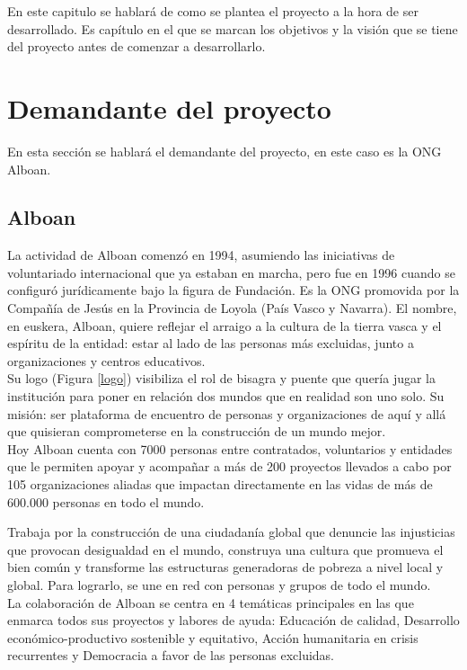 En este capitulo se hablará de como se plantea el proyecto a la hora de ser desarrollado. Es capítulo en el que se marcan los objetivos y la visión que se tiene del proyecto antes de comenzar a desarrollarlo. 

\section{Demandante del proyecto}
En esta sección se hablará el demandante del proyecto, en este caso es la ONG Alboan.

\subsection{Alboan}

La actividad de Alboan comenzó en 1994, asumiendo las iniciativas de voluntariado
internacional que ya estaban en marcha, pero fue en 1996 cuando se configuró
jurídicamente bajo la figura de Fundación. Es la ONG promovida por la Compañía de Jesús en la Provincia de Loyola (País Vasco y Navarra). El nombre, en euskera, Alboan, quiere reflejar el arraigo a la cultura de la tierra vasca y el espíritu de la entidad: estar al lado de las personas más excluidas, junto a organizaciones y centros educativos.\\

Su logo (Figura \ref{logo}) visibiliza  el rol de bisagra y puente que quería jugar la institución para poner en relación dos mundos que en realidad son uno solo. Su misión: ser plataforma de encuentro de personas y organizaciones de aquí y allá que quisieran comprometerse en la construcción de un mundo mejor.\\

Hoy Alboan cuenta con 7000 personas entre contratados, voluntarios y entidades que le permiten apoyar y acompañar a más de 200 proyectos llevados a cabo por 105 organizaciones
aliadas que impactan directamente en las vidas de más de 600.000 personas en todo
el mundo.


Trabaja por la construcción de una ciudadanía global que denuncie las injusticias que provocan desigualdad en el mundo, construya una cultura que promueva el bien común y transforme las estructuras generadoras de pobreza a nivel local y global. Para lograrlo, se une en red con personas y grupos de todo el mundo.\\

La colaboración de Alboan se centra en 4 temáticas principales en las que enmarca todos sus proyectos y labores de ayuda: Educación de calidad, Desarrollo económico-productivo sostenible y equitativo, Acción humanitaria en crisis recurrentes y Democracia a favor de las personas excluidas.\\


